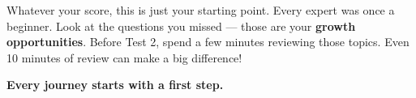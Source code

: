 {\begin{tcolorbox}[
    enhanced,
    colback=funGreenLight,
    colframe=funGreen!50,
    arc=10pt,
    boxrule=1pt,
    left=6mm, right=6mm, top=4mm, bottom=4mm,
]
\vspace{2mm}

Whatever your score, this is just your starting point. Every expert was once a beginner. Look at the questions you missed — those are your \textbf{growth opportunities}. Before Test 2, spend a few minutes reviewing those topics. Even 10 minutes of review can make a big difference!
\end{tcolorbox}

\vspace{4mm}

\begin{center}
{\large\bfseries\color{funBlueDark} \faChartLine\hspace{2mm}Every journey starts with a first step.\hspace{2mm}\faChartLine}
\end{center}

}
\newpage
